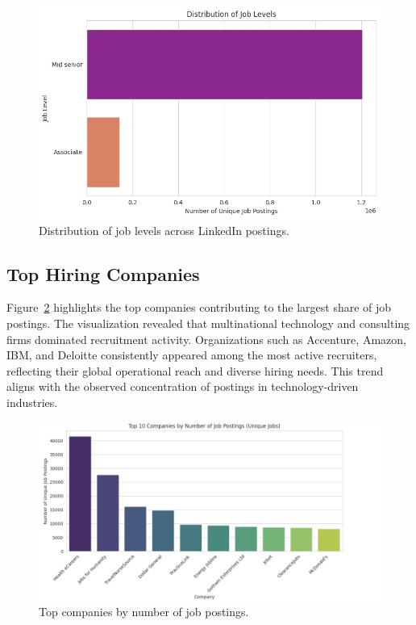 \documentclass[conference]{IEEEtran}
\begin{document}
\begin{figure}[htbp]
\centering
    \includegraphics[width=\linewidth]{joblevels.jpeg}
\caption{Distribution of job levels across LinkedIn postings.}
\label{fig:joblevel}
\end{figure}


\subsection{Top Hiring Companies}
Figure~\ref{fig:companies} highlights the top companies contributing to the largest share of job postings. The visualization revealed that multinational technology and consulting firms dominated recruitment activity. Organizations such as Accenture, Amazon, IBM, and Deloitte consistently appeared among the most active recruiters, reflecting their global operational reach and diverse hiring needs. This trend aligns with the observed concentration of postings in technology-driven industries.

\begin{figure}[htbp]
 \centering
    \includegraphics[width=\linewidth]{job_type_distribution.png}
    
\caption{Top companies by number of job postings.}
\label{fig:companies}
\end{figure}
\end{document}
